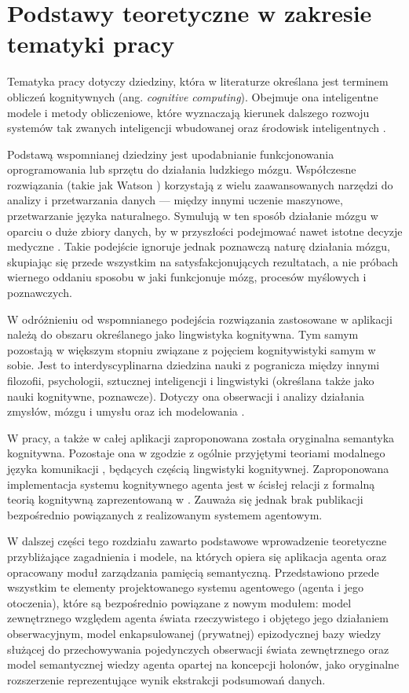 
\chapter{Podstawy teoretyczne w zakresie tematyki pracy}

Tematyka pracy dotyczy dziedziny, która w literaturze określana jest terminem obliczeń kognitywnych (ang. \textit{cognitive computing}). Obejmuje ona inteligentne modele i metody obliczeniowe, które wyznaczają kierunek dalszego rozwoju systemów tak zwanych inteligencji wbudowanej oraz środowisk inteligentnych \cite{hur15}.

Podstawą wspomnianej dziedziny jest upodabnianie funkcjonowania oprogramowania lub sprzętu do działania ludzkiego mózgu. Współczesne rozwiązania (takie jak  Watson \cite{kel13}) korzystają z wielu zaawansowanych narzędzi do analizy i przetwarzania danych --- między innymi uczenie maszynowe, przetwarzanie języka naturalnego. Symulują w ten sposób działanie mózgu w oparciu o duże zbiory danych, by w przyszłości podejmować nawet istotne decyzje medyczne \cite{woo15}. Takie podejście ignoruje jednak poznawczą naturę działania mózgu, skupiając się przede wszystkim na satysfakcjonujących rezultatach, a nie próbach wiernego oddaniu sposobu w jaki funkcjonuje mózg, procesów myślowych i poznawczych.

W odróżnieniu od wspomnianego podejścia rozwiązania zastosowane w aplikacji należą do obszaru określanego jako lingwistyka kognitywna. Tym samym pozostają w większym stopniu związane z pojęciem kognitywistyki samym w sobie. Jest to interdyscyplinarna dziedzina nauki z pogranicza między innymi filozofii, psychologii, sztucznej inteligencji i lingwistyki (określana także jako nauki kognitywne, poznawcze). Dotyczy ona obserwacji i analizy działania zmysłów, mózgu i umysłu oraz ich modelowania \cite{tha17}.

W pracy, a także w całej aplikacji zaproponowana została oryginalna semantyka kognitywna. Pozostaje ona w zgodzie z ogólnie przyjętymi teoriami modalnego języka komunikacji \cite{tal00}, będących częścią lingwistyki kognitywnej. Zaproponowana implementacja systemu kognitywnego agenta jest w ścisłej relacji z formalną teorią kognitywną zaprezentowaną w \cite{kat07}. Zauważa się jednak brak publikacji bezpośrednio powiązanych z realizowanym systemem agentowym.

W dalszej części tego rozdziału zawarto podstawowe wprowadzenie teoretyczne przybliżające zagadnienia i modele, na których opiera się aplikacja agenta oraz opracowany moduł zarządzania pamięcią semantyczną. Przedstawiono przede wszystkim te elementy projektowanego systemu agentowego (agenta i jego otoczenia), które są bezpośrednio powiązane z nowym modułem: model zewnętrznego względem agenta świata rzeczywistego i objętego jego działaniem obserwacyjnym, model enkapsulowanej (prywatnej) epizodycznej bazy wiedzy służącej do przechowywania pojedynczych obserwacji świata zewnętrznego oraz model semantycznej wiedzy agenta opartej na koncepcji holonów, jako oryginalne rozszerzenie reprezentujące wynik ekstrakcji podsumowań danych.

